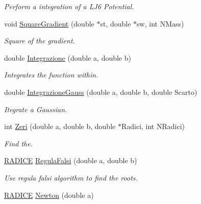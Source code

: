 \begin{DoxyCompactItemize}
\begin{DoxyCompactList}\small\item\em \-Perform a integration of a \-L\-J6 \-Potential. \end{DoxyCompactList}\item 
\hypertarget{classMatematica_a150471024129f85823beffb064c4df19}{void \hyperlink{classMatematica_a150471024129f85823beffb064c4df19}{\-Square\-Gradient} (double $\ast$st, double $\ast$sw, int \-N\-Mass)}\label{classMatematica_a150471024129f85823beffb064c4df19}

\begin{DoxyCompactList}\small\item\em \-Square of the gradient. \end{DoxyCompactList}\item 
double \hyperlink{classMatematica_ac1a876ecf4d7f14cc38a7add8f6ba984}{\-Integrazione} (double a, double b)
\begin{DoxyCompactList}\small\item\em \-Integrates the function within. \end{DoxyCompactList}\item 
\hypertarget{classMatematica_a5382dfb3aa67420d9fbd6619c1aa7796}{double \hyperlink{classMatematica_a5382dfb3aa67420d9fbd6619c1aa7796}{\-Integrazione\-Gauss} (double a, double b, double \-Scarto)}\label{classMatematica_a5382dfb3aa67420d9fbd6619c1aa7796}

\begin{DoxyCompactList}\small\item\em \-Itegrate a \-Gaussian. \end{DoxyCompactList}\item 
int \hyperlink{classMatematica_af1e1e5332753626f39db69dca411ecfc}{\-Zeri} (double a, double b, double $\ast$\-Radici, int \-N\-Radici)
\begin{DoxyCompactList}\small\item\em \-Find the. \end{DoxyCompactList}\item 
\hypertarget{classMatematica_a5b8fbf8c761f9756710aeed5caed4c5e}{\hyperlink{structRADICE}{\-R\-A\-D\-I\-C\-E} \hyperlink{classMatematica_a5b8fbf8c761f9756710aeed5caed4c5e}{\-Regula\-Falsi} (double a, double b)}\label{classMatematica_a5b8fbf8c761f9756710aeed5caed4c5e}

\begin{DoxyCompactList}\small\item\em \-Use regula falsi algorithm to find the roots. \end{DoxyCompactList}\item 
\hypertarget{classMatematica_a721bd6eae0ff0aa70b8b37327b084e78}{\hyperlink{structRADICE}{\-R\-A\-D\-I\-C\-E} \hyperlink{classMatematica_a721bd6eae0ff0aa70b8b37327b084e78}{\-Newton} (double a)}\label{classMatematica_a721bd6eae0ff0aa70b8b37327b084e78}


\end{DoxyCompactItemize}

